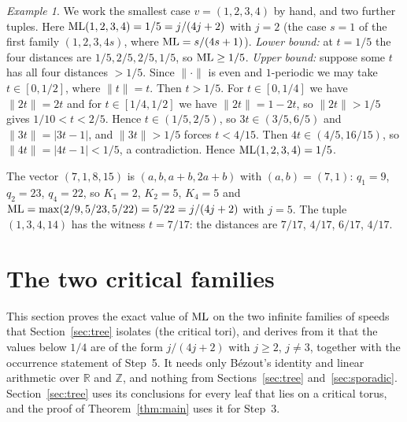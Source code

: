 \documentclass[11pt]{article}
\theoremstyle{remark}
\newtheorem{example}[theorem]{Example}
\newcommand{\R}{\mathbb{R}}
\newcommand{\Z}{\mathbb{Z}}
\newcommand{\dist}[1]{\lVert #1\rVert}
\begin{document}
\begin{example}\label{ex:smallest}
We work the smallest case $v=(1,2,3,4)$ by hand, and two further tuples. Here $\mathrm{ML}(1,2,3,4)=1/5=j/(4j+2)$ with $j=2$ (the case $s=1$ of the first family $(1,2,3,4s)$, where $\mathrm{ML}=s/(4s+1)$). \emph{Lower bound:} at $t=1/5$ the four distances are $1/5,2/5,2/5,1/5$, so $\mathrm{ML}\ge1/5$. \emph{Upper bound:} suppose some $t$ has all four distances $>1/5$. Since $\dist{\cdot}$ is even and $1$-periodic we may take $t\in[0,1/2]$, where $\dist t=t$. Then $t>1/5$. For $t\in[0,1/4]$ we have $\dist{2t}=2t$ and for $t\in[1/4,1/2]$ we have $\dist{2t}=1-2t$, so $\dist{2t}>1/5$ gives $1/10<t<2/5$. Hence $t\in(1/5,2/5)$, so $3t\in(3/5,6/5)$ and $\dist{3t}=|3t-1|$, and $\dist{3t}>1/5$ forces $t<4/15$. Then $4t\in(4/5,16/15)$, so $\dist{4t}=|4t-1|<1/5$, a contradiction. Hence $\mathrm{ML}(1,2,3,4)=1/5$.

The vector $(7,1,8,15)$ is $(a,b,a+b,2a+b)$ with $(a,b)=(7,1)$: $q_1=9$, $q_2=23$, $q_4=22$, so $K_1=2$, $K_2=5$, $K_4=5$ and $\mathrm{ML}=\max(2/9,5/23,5/22)=5/22=j/(4j+2)$ with $j=5$. The tuple $(1,3,4,14)$ has the witness $t=7/17$: the distances are $7/17$, $4/17$, $6/17$, $4/17$.
\end{example}

\section{The two critical families}\label{sec:tails}

This section proves the exact value of $\mathrm{ML}$ on the two infinite families of speeds that Section~\ref{sec:tree} isolates (the critical tori), and derives from it that the values below $1/4$ are of the form $j/(4j+2)$ with $j\ge2$, $j\ne3$, together with the occurrence statement of Step~5. It needs only B\'ezout's identity and linear arithmetic over $\R$ and $\Z$, and nothing from Sections~\ref{sec:tree} and~\ref{sec:sporadic}. Section~\ref{sec:tree} uses its conclusions for every leaf that lies on a critical torus, and the proof of Theorem~\ref{thm:main} uses it for Step~3.
\end{document}
